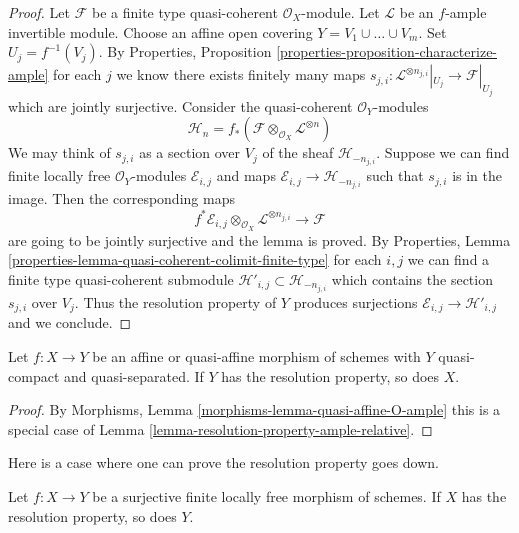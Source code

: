 \begin{proof}
Let $\mathcal{F}$ be a finite type quasi-coherent $\mathcal{O}_X$-module.
Let $\mathcal{L}$ be an $f$-ample invertible module.
Choose an affine open covering $Y = V_1 \cup \ldots \cup V_m$.
Set $U_j = f^{-1}(V_j)$. By Properties, Proposition
\ref{properties-proposition-characterize-ample}
for each $j$ we know there exists finitely many maps
$s_{j, i} : \mathcal{L}^{\otimes n_{j, i}}|_{U_j} \to \mathcal{F}|_{U_j}$
which are jointly surjective. Consider the quasi-coherent
$\mathcal{O}_Y$-modules
$$
\mathcal{H}_n =
f_*(\mathcal{F} \otimes_{\mathcal{O}_X} \mathcal{L}^{\otimes n})
$$
We may think of $s_{j, i}$ as a section over $V_j$ of the sheaf
$\mathcal{H}_{-n_{j, i}}$. Suppose we can find finite locally
free $\mathcal{O}_Y$-modules $\mathcal{E}_{i, j}$ and maps
$\mathcal{E}_{i, j} \to \mathcal{H}_{-n_{j, i}}$ such that
$s_{j, i}$ is in the image. Then the corresponding maps
$$
f^*\mathcal{E}_{i, j}
\otimes_{\mathcal{O}_X}
\mathcal{L}^{\otimes n_{j, i}} \longrightarrow \mathcal{F}
$$
are going to be jointly surjective and the lemma is proved. By
Properties, Lemma \ref{properties-lemma-quasi-coherent-colimit-finite-type}
for each $i, j$ we can find a finite
type quasi-coherent submodule
$\mathcal{H}'_{i, j} \subset  \mathcal{H}_{-n_{j, i}}$
which contains the section $s_{j, i}$ over $V_j$.
Thus the resolution property of $Y$ produces surjections
$\mathcal{E}_{i, j} \to \mathcal{H}'_{i, j}$ and we conclude.
\end{proof}

\begin{lemma}
\label{lemma-resolution-property-goes-up-affine}
Let $f : X \to Y$ be an affine or quasi-affine morphism of schemes with
$Y$ quasi-compact and quasi-separated.
If $Y$ has the resolution property, so does $X$.
\end{lemma}

\begin{proof}
By Morphisms, Lemma \ref{morphisms-lemma-quasi-affine-O-ample}
this is a special case of
Lemma \ref{lemma-resolution-property-ample-relative}.
\end{proof}

\noindent
Here is a case where one can prove the resolution property goes down.

\begin{lemma}
\label{lemma-resolution-property-goes-down-finite-flat}
Let $f : X \to Y$ be a surjective finite locally free morphism of schemes.
If $X$ has the resolution property, so does $Y$.
\end{lemma}

